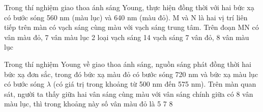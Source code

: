 \begin{ex}%
Trong thí nghiệm giao thoa ánh sáng Young, thực hiện đồng thời với hai bức xạ có bước sóng 560 nm (màu lục) và 640 nm (màu đỏ). M và N là hai vị trí liên tiếp trên màn có vạch sáng cùng màu với vạch sáng trung tâm. Trên đoạn MN có
\choice
{ vân màu đỏ, 7 vân màu lục}
{2 loại vạch sáng}
{14 vạch sáng}
{7 vân đỏ, 8 vân màu lục}
\end{ex} 
\begin{ex}%
Trong thí nghiệm Young về giao thoa ánh sáng, nguồn sáng phát đồng thời hai bức xạ đơn sắc, trong đó bức xạ màu đỏ có bước sóng 720 nm và bức xạ màu lục có bước sóng $\lambda $ (có giá trị trong khoảng từ 500 nm đến 575 nm). Trên màn quan sát, người ta thấy giữa hai vân sáng cùng màu với vân sáng chính giữa có 8 vân màu lục, thì trong khoảng này số vân màu đỏ là
\choice
{5}
{}
{7}
{8}

\end{ex} 

